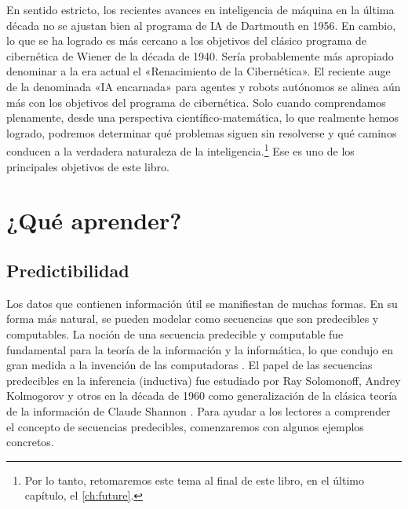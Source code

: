 \documentclass[../../book-main_es.tex]{subfiles}
\begin{document}
En sentido estricto, los recientes avances en inteligencia de máquina en la
última década no se ajustan bien al programa de IA de Dartmouth en 1956.
En cambio, lo que se ha logrado es más cercano a los objetivos del
clásico programa de cibernética de Wiener de la década de 1940.
Sería probablemente más apropiado denominar a la era actual el «Renacimiento 
de la Cibernética». El reciente auge de la denominada «IA encarnada» para
agentes y robots autónomos se alinea aún más con los objetivos del programa 
de cibernética. Solo cuando comprendamos plenamente, desde una perspectiva 
científico-matemática, lo que realmente hemos logrado, podremos
determinar qué problemas siguen sin resolverse y qué caminos conducen a la
verdadera naturaleza de la inteligencia.\footnote{Por lo tanto, retomaremos 
este tema al final de este libro, en el último capítulo, el \ref{ch:future}.} 
Ese es uno de los principales objetivos de este libro.

\section{¿Qué aprender?}
\label{sec:what-to-learn}

\subsection{Predictibilidad}
\label{sec:predictability}
Los datos que contienen información útil se manifiestan de muchas formas. En su
forma más natural, se pueden modelar como secuencias que son predecibles y 
computables. La noción de una secuencia predecible y computable fue 
fundamental para la teoría de la información \cite{Shannon-1948} y la 
informática, lo que condujo en gran medida a la invención de las computadoras 
\cite{Turing-1936}. El papel de las secuencias predecibles en la inferencia 
(inductiva) fue estudiado por Ray Solomonoff, Andrey Kolmogorov y otros en la 
década de 1960 \cite{Kolmogorov1998OnTO} como generalización de la clásica 
teoría de la información de Claude Shannon \cite{Shannon-1948}. Para ayudar 
a los lectores a comprender el concepto de secuencias predecibles, 
comenzaremos con algunos ejemplos concretos.
\end{document}
